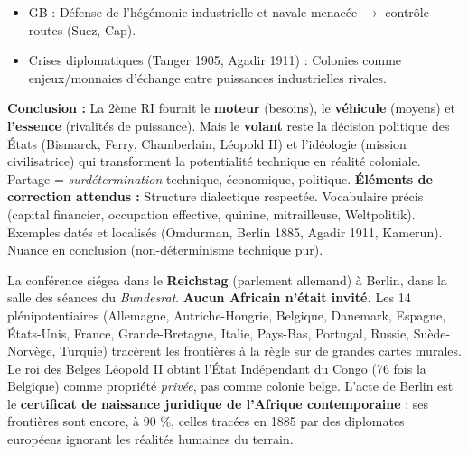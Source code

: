 \documentclass[11pt]{article}
\begin{document}
\begin{exoresolu}
\begin{itemize}
    \item GB : Défense de l'hégémonie industrielle et navale menacée $\rightarrow$ contrôle routes (Suez, Cap).
    \item Crises diplomatiques (Tanger 1905, Agadir 1911) : Colonies comme enjeux/monnaies d'échange entre puissances industrielles rivales.
\end{itemize}
\textbf{Conclusion :} La 2ème RI fournit le \textbf{moteur} (besoins), le \textbf{véhicule} (moyens) et \textbf{l'essence} (rivalités de puissance). Mais le \textbf{volant} reste la décision politique des États (Bismarck, Ferry, Chamberlain, Léopold II) et l'idéologie (mission civilisatrice) qui transforment la potentialité technique en réalité coloniale. Partage = \emph{surdétermination} technique, économique, politique.
\tcblower
\textbf{Éléments de correction attendus :} Structure dialectique respectée. Vocabulaire précis (capital financier, occupation effective, quinine, mitrailleuse, Weltpolitik). Exemples datés et localisés (Omdurman, Berlin 1885, Agadir 1911, Kamerun). Nuance en conclusion (non-déterminisme technique pur).
\end{exoresolu}

\begin{savaistu}
La conférence siégea dans le \textbf{Reichstag} (parlement allemand) à Berlin, dans la salle des séances du \emph{Bundesrat}. \textbf{Aucun Africain n'était invité.} Les 14 plénipotentiaires (Allemagne, Autriche-Hongrie, Belgique, Danemark, Espagne, États-Unis, France, Grande-Bretagne, Italie, Pays-Bas, Portugal, Russie, Suède-Norvège, Turquie) tracèrent les frontières à la règle sur de grandes cartes murales. Le roi des Belges Léopold II obtint l'État Indépendant du Congo (76 fois la Belgique) comme propriété \emph{privée}, pas comme colonie belge. L'acte de Berlin est le \textbf{certificat de naissance juridique de l'Afrique contemporaine} : ses frontières sont encore, à 90 \%, celles tracées en 1885 par des diplomates européens ignorant les réalités humaines du terrain.
\end{savaistu}
\end{document}
